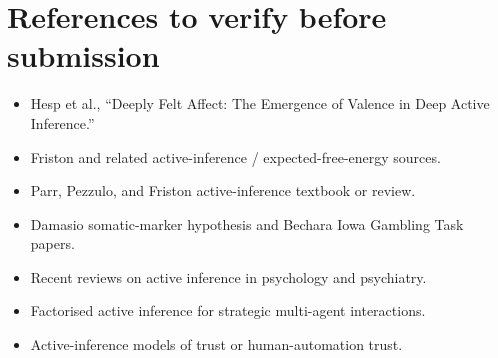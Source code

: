 \section*{References to verify before submission}

\begin{itemize}
  \item Hesp et al., ``Deeply Felt Affect: The Emergence of Valence in Deep Active Inference.'' 
  \item Friston and related active-inference / expected-free-energy sources. 
  \item Parr, Pezzulo, and Friston active-inference textbook or review. 
  \item Damasio somatic-marker hypothesis and Bechara Iowa Gambling Task papers. 
  \item Recent reviews on active inference in psychology and psychiatry. 
  \item Factorised active inference for strategic multi-agent interactions. 
  \item Active-inference models of trust or human-automation trust. 
\end{itemize}
